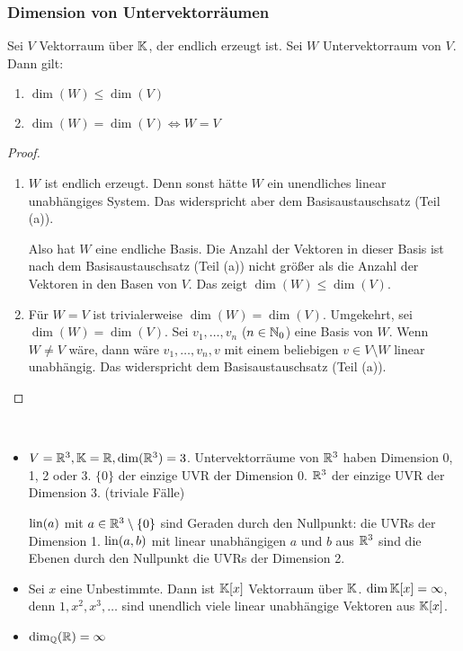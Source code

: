 \subsubsection{Dimension von Untervektorräumen}

\begin{klr}
	Sei $ V $ Vektorraum über $ \mathbb K $, der endlich erzeugt ist. Sei $ W $ Untervektorraum von $ V $. Dann gilt:
	\begin{enumerate}
		\item $ \dim(W) \leq \dim(V) $
		\item $ \dim(W) = \dim(V) \Leftrightarrow W = V $
	\end{enumerate}
\end{klr}

\begin{proof}
\begin{enumerate}
	\item
	$ W $ ist endlich erzeugt. Denn sonst hätte $ W $ ein unendliches linear unabhängiges System. Das widerspricht aber dem Basisaustauschsatz (Teil (a)).
	
	Also hat $ W $ eine endliche Basis. Die Anzahl der Vektoren in dieser Basis ist nach dem Basisaustauschsatz (Teil (a)) nicht größer als die Anzahl der Vektoren in den Basen von $ V $. Das zeigt $ \dim(W) \leq \dim(V) $.
	
	\item
	Für $ W = V $ ist trivialerweise $ \dim(W) = \dim(V) $. Umgekehrt, sei $ \dim(W) = \dim(V) $. Sei $ v_1, \ldots, v_n $ ($ n \in \mathbb N_0 $) eine Basis von $ W $. Wenn $ W \neq V $ wäre, dann wäre $ v_1, \ldots, v_n, v $ mit einem beliebigen $ v \in V \setminus W $ linear unabhängig. Das widerspricht dem Basisaustauschsatz (Teil (a)). \qedhere
\end{enumerate}
\end{proof}

\begin{bsp}\
\begin{itemize}
	\item $ V = \mathbb R^3, \mathbb K = \mathbb R, \dim(\mathbb R^3) = 3 $. Untervektorräume von $ \mathbb R^3 $ haben Dimension 0, 1, 2 oder 3. $ \{ 0 \} $ der einzige UVR der Dimension 0. $ \mathbb R^3 $ der einzige UVR der Dimension 3. (triviale Fälle)
		
	$ \operatorname{lin}(a) $ mit $ a \in \mathbb R^3 \setminus \{ 0 \} $ sind Geraden durch den Nullpunkt: die UVRs der Dimension 1. $ \operatorname{lin}(a,b) $ mit linear unabhängigen $ a $ und $ b $ aus $ \mathbb R^3 $ sind die Ebenen durch den Nullpunkt die UVRs der Dimension 2.
	\item Sei $ x $ eine Unbestimmte. Dann ist $ \mathbb K[x] $ Vektorraum über $ \mathbb K $. $ \dim\mathbb K[x] = \infty $, denn $ 1, x^2, x^3, \ldots $ sind unendlich viele linear unabhängige Vektoren aus $ \mathbb K[x] $.
	\item $ \dim_\mathbb Q(\mathbb R) = \infty $
\end{itemize}
\end{bsp}

